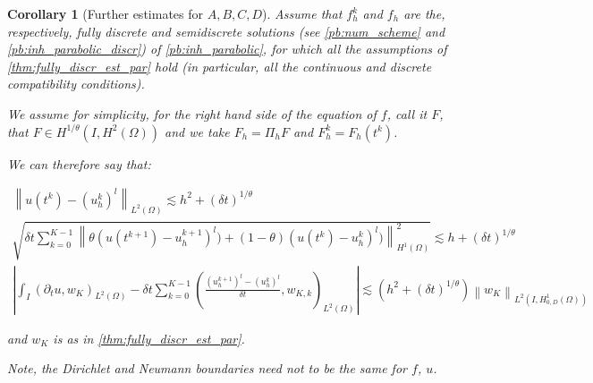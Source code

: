 \documentclass[english,a4paper,10pt,oneside]{scrbook}	%
\theoremstyle{break}
\newtheorem{cor}[equation]{Corollary}
\theoremstyle{remark}
\newcommand{\norm}[1]{\left\lVert#1\right\rVert}
\begin{document}
\begin{cor}[Further estimates for $A,B,C,D$]
\label{cor:actual_par_est}
Assume that $f_h^k$ and $f_h$ are the, respectively, fully discrete and semidiscrete solutions (see \cref{pb:num_scheme} and  \cref{pb:inh_parabolic_discr}) of \cref{pb:inh_parabolic}, for which all the assumptions of \cref{thm:fully_discr_est_par} hold (in particular, all the continuous and discrete compatibility conditions).

We assume for simplicity, for the right hand side of the equation of $f$, call it $F$, that $F \in H^{1/\theta}(I,H^2(\Omega))$ and we take $F_h = \Pi_h F$ and $F_h^k=F_h(t^k)$.

We can therefore say that:

\begin{align*}
	\norm{u(t^k)-(u_h^k)^l}_{L^2(\Omega)}\lesssim  h^2 + (\delta t)^{1/\theta}\\
	\sqrt{\delta t \sum_{k=0}^{K-1} \norm{\theta(u(t^{k+1}) - u_h^{k+1})^l) + (1-\theta)(u(t^{k}) - u_h^{k})^l)}_{H^1(\Omega)}^2} \lesssim h + (\delta t)^{1/\theta}\\
	\left | \int_I (\partial_t u , w_K)_{L^2(\Omega)}-\delta t \sum_{k=0}^{K-1}\left ( \frac{(u^{k+1}_h)^l - (u_h^k)^l}{\delta t} , w_{K,k}\right )_{L^2(\Omega)} \right |\lesssim \left ( h^2 + (\delta t)^{1/\theta} \right ) \norm{w_K}_{L^2(I,H^1_{0,D}(\Omega))}
\end{align*}

and $w_K$ is as in \cref{thm:fully_discr_est_par}.

Note, the Dirichlet and Neumann boundaries need not to be the same for $f$, $u$.

\end{cor}
\end{document}
